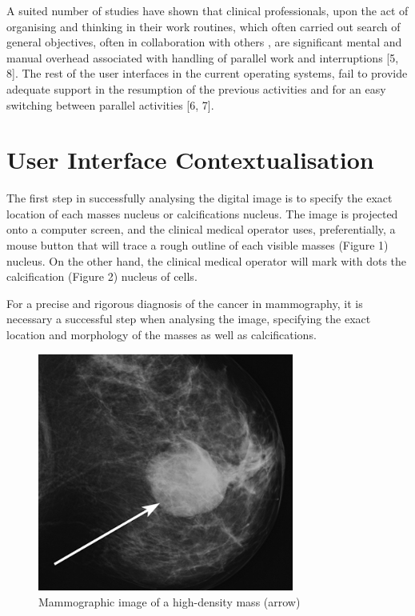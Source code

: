 A  suited  number  of  studies  have  shown  that  clinical  professionals, upon the act of organising and thinking in their work routines, which often carried out search of general objectives, often in collaboration with others \break [9, 10, 11], are significant mental and manual overhead associated with handling of  parallel  work  and  interruptions [5,  8]. The rest of the user  interfaces  in  the  current operating systems, fail to provide adequate support in the resumption of the previous  activities  and  for an  easy  switching  between  parallel  activities [6, 7].

\section{User Interface Contextualisation}

The first step in successfully analysing the digital image is to specify the exact location of each masses nucleus or calcifications nucleus. The image is projected onto a computer screen, and the clinical medical operator uses, preferentially, a mouse button that will trace a rough outline of each visible masses (Figure 1) nucleus. On the other hand, the clinical medical operator will mark with dots the calcification (Figure 2) nucleus of cells.

For a precise and rigorous diagnosis of the cancer in mammography, it is necessary a successful step when analysing the image, specifying the exact location and morphology of the masses as well as calcifications.

\begin{figure}[!hbt]
\centering
\includegraphics[width=0.75\textwidth]{masses.png}
\caption{\label{fig:frog}Mammographic image of a high-density mass (arrow)
}
\end{figure}

